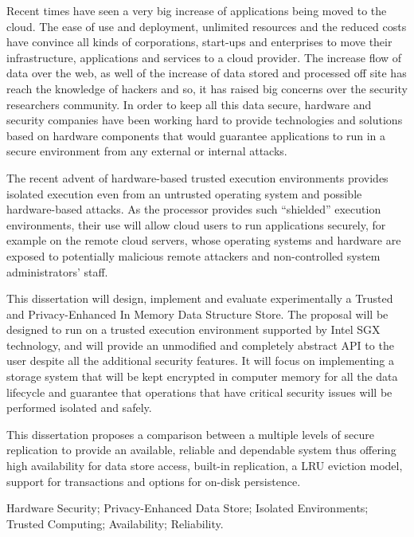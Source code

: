 Recent times have seen a very big increase of applications being moved to the cloud. The ease of use and deployment, unlimited resources and the reduced costs have convince all kinds of corporations, start-ups and enterprises to move their infrastructure, applications and services to a cloud provider. The increase flow of data over the web, as well of the increase of data stored and processed off site has reach the knowledge of hackers and so, it has raised big concerns over the security researchers community. In order to keep all this data secure, hardware and security companies have been working hard to provide technologies and solutions based on hardware components that would guarantee applications to run in a secure environment from any external or internal attacks.

The recent advent of hardware-based trusted execution environments provides isolated execution even from an untrusted operating system and possible hardware-based attacks. As the processor provides such “shielded” execution environments, their use will allow cloud users to run applications securely, for example on the remote cloud servers, whose operating systems and hardware are exposed to potentially malicious remote attackers and non-controlled system administrators’ staff.

This dissertation will design, implement and evaluate experimentally a Trusted and Privacy-Enhanced In Memory Data Structure Store. The proposal will be designed to run on a trusted execution environment supported by Intel SGX technology, and will provide an unmodified and completely abstract API to the user despite all the additional security features. It will focus on implementing a storage system that will be kept encrypted in computer memory for all the data lifecycle and guarantee that operations that have critical security issues will be performed isolated and safely.

This dissertation proposes a comparison between a multiple levels of secure replication to provide an available, reliable and dependable system thus offering high availability for data store access, built-in replication, a LRU eviction model, support for transactions and options for on-disk persistence.

\begin{keywords}
Hardware Security; Privacy-Enhanced Data Store; Isolated Environments; Trusted Computing; Availability; Reliability.
\end{keywords} 
